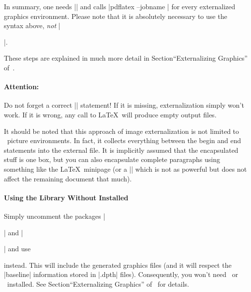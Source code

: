 In summary, one needs |\pgfrealjobname| and calls |pdflatex --jobname | for every externalized graphics environment. Please note that it is absolutely necessary to use the syntax above, \emph{not} |\begin{pgfgraphicnamed}|.

These steps are explained in much more detail in Section``Externalizing Graphics'' of~\cite{tikz}.

\paragraph{Attention:} Do not forget a correct |\pgfrealjobname| statement! If it is missing, externalization simply won't work. If it is wrong, any call to \LaTeX\ will produce empty output files.

It should be noted that this approach of image externalization is not limited to \Tikz\ picture environments. In fact, it collects everything between the begin and end statements into the external file. It is implicitly assumed that the encapsulated stuff is one box, but you can also encapsulate complete paragraphs using something like the \LaTeX\ minipage (or a |\vbox| which is not as powerful but does not affect the remaining document that much).


\paragraph{Using the Library Without {\normalfont\pgfname} Installed}
Simply uncomment the packages |\usepackage{tikz}| and |\usepackage{pgfplots}| and use
\begin{codeexample}
\long{}
\end{codeexample}
instead. This will include the generated graphics files (and it will respect the |baseline| information stored in |.dpth| files). Consequently, you won't need \pgfname\ or \PGFPlots\ installed. See Section``Externalizing Graphics'' of~\cite{tikz} for details.



\end{pgfgraphicnamed}
